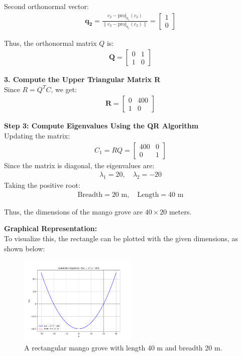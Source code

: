 \documentclass[journal]{IEEEtran}
\begin{document}
Second orthonormal vector:
\begin{align}
    \mathbf{q_2} = \frac{c_2 - \text{proj}_{q_1} (c_2)}{\|c_2 - \text{proj}_{q_1} (c_2)\|} = \begin{bmatrix} 1 \\ 0 \end{bmatrix}
\end{align}

Thus, the orthonormal matrix \( Q \) is:
\begin{align}
    \mathbf{Q} = \begin{bmatrix} 0 & 1 \\ 1 & 0 \end{bmatrix}
\end{align}

\textbf{3. Compute the Upper Triangular Matrix R} \\
Since \( R = Q^T C \), we get:
\begin{align}
    \mathbf{R} = \begin{bmatrix} 0 & 400 \\ 1 & 0 \end{bmatrix}
\end{align}

\textbf{Step 3: Compute Eigenvalues Using the QR Algorithm} \\
Updating the matrix:
\begin{align}
    C_1 = RQ = \begin{bmatrix} 400 & 0 \\ 0 & 1 \end{bmatrix}
\end{align}
Since the matrix is diagonal, the eigenvalues are:
\begin{align}
    \lambda_1 = 20, \quad \lambda_2 = -20
\end{align}
Taking the positive root:
\begin{align}
    \text{Breadth} = 20\text{ m}, \quad \text{Length} = 40\text{ m}
\end{align}

Thus, the dimensions of the mango grove are \(40 \times 20\) meters.



\textbf{Graphical Representation:}\\
To visualize this, the rectangle can be plotted with the given dimensions, as shown below:
\begin{figure}[ht] %
    \centering
    \includegraphics[width=0.5\textwidth]{figs/Figure_1.png} %
    \caption{A rectangular mango grove with length 40 m and breadth 20 m.}
    \label{fig:mango_grove}
\end{figure}
\end{document}
